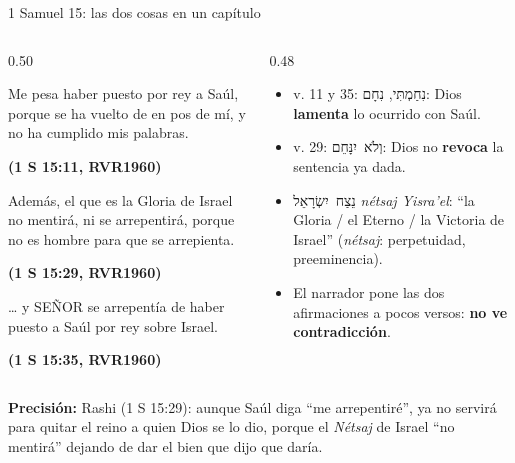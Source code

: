 \documentclass[hyperref={bookmarks=false},aspectratio=169]{beamer}
\newcommand{\heb}[1]{\mbox{\foreignlanguage{hebrew}{#1}}}
\newcommand{\SENOR}{S{\fontsize{0.78em}{1em}\selectfont EÑOR}}
\newcommand{\fuente}[1]{\par\hfill{\upshape\bfseries\footnotesize\textcolor{azul}{#1}}}
\newcommand{\destacar}[1]{\textbf{\textcolor{azul}{#1}}}
\newcommand{\precision}[1]{{\footnotesize\color{gris}\textbf{Precisión:} #1}}
\begin{document}
\begin{frame}{1 Samuel 15: las dos cosas en un capítulo}
\begin{columns}[t,onlytextwidth]
\begin{column}{0.50\textwidth}
\begin{cita}Me pesa haber puesto por rey a Saúl, porque se ha vuelto de en pos de mí, y no ha cumplido mis palabras.\fuente{(1 S 15:11, RVR1960)}\end{cita}
\begin{cita}Además, el que es la Gloria de Israel no mentirá, ni se arrepentirá, porque no es hombre para que se arrepienta.\fuente{(1 S 15:29, RVR1960)}\end{cita}
\begin{cita}\ldots{} y \SENOR{} se arrepentía de haber puesto a Saúl por rey sobre Israel.\fuente{(1 S 15:35, RVR1960)}\end{cita}
\end{column}
\begin{column}{0.48\textwidth}\small
\begin{itemize}
\item v. 11 y 35: \heb{נִחַמְתִּי}, \heb{נִחָם}: Dios \destacar{lamenta} lo ocurrido con Saúl.
\item v. 29: \heb{וְלֹא יִנָּחֵם}: Dios no \destacar{revoca} la sentencia ya dada.
\item \heb{נֵצַח יִשְׂרָאֵל} \emph{nétsaj Yisra'el}: ``la Gloria / el Eterno / la Victoria de Israel'' (\emph{nétsaj}: perpetuidad, preeminencia).
\item El narrador pone las dos afirmaciones a pocos versos: \destacar{no ve contradicción}.
\end{itemize}
\end{column}
\end{columns}\par\smallskip
\precision{Rashi (1 S 15:29): aunque Saúl diga ``me arrepentiré'', ya no servirá para quitar el reino a quien Dios se lo dio, porque el \emph{Nétsaj} de Israel ``no mentirá'' dejando de dar el bien que dijo que daría.}
\end{frame}
\end{document}
